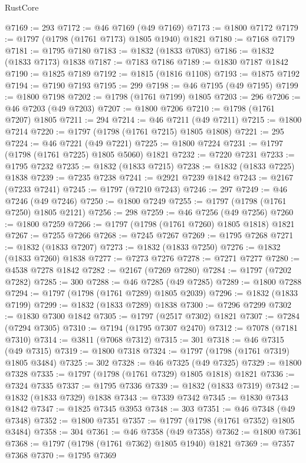 \begin{lexlean}{RustCore}
\begin{coremodule}
@7169 := 293
@7172 := @46 @7169 (@49 @7169)
@7173 := @1800 @7172
@7179 := @1797 (@1798 (@1761 @7173) @1805 @1940) @1821
@7180 := @7168 @7179
@7181 := @1795 @7180
@7183 := @1832 (@1833 @7083)
@7186 := @1832 (@1833 @7173) @1838
@7187 := @7183 @7186
@7189 := @1830 @7187 @1842
@7190 := @1825 @7189
@7192 := @1815 (@1816 @1108)
@7193 := @1875 @7192
@7194 := @7190 @7193
@7195 := 299
@7198 := @46 @7195 (@49 @7195)
@7199 := @1800 @7198
@7202 := @1798 (@1761 @7199) @1805
@7203 := 296
@7206 := @46 @7203 (@49 @7203)
@7207 := @1800 @7206
@7210 := @1798 (@1761 @7207) @1805
@7211 := 294
@7214 := @46 @7211 (@49 @7211)
@7215 := @1800 @7214
@7220 := @1797 (@1798 (@1761 @7215) @1805 @1808)
@7221 := 295
@7224 := @46 @7221 (@49 @7221)
@7225 := @1800 @7224
@7231 := @1797 (@1798 (@1761 @7225) @1805 @5060) @1821
@7232 := @7220 @7231
@7233 := @1795 @7232
@7235 := @1832 (@1833 @7215)
@7238 := @1832 (@1833 @7225) @1838
@7239 := @7235 @7238
@7241 := @2921 @7239 @1842
@7243 := @2167 (@7233 @7241)
@7245 := @1797 (@7210 @7243)
@7246 := 297
@7249 := @46 @7246 (@49 @7246)
@7250 := @1800 @7249
@7255 := @1797 (@1798 (@1761 @7250) @1805 @2121)
@7256 := 298
@7259 := @46 @7256 (@49 @7256)
@7260 := @1800 @7259
@7266 := @1797 (@1798 (@1761 @7260) @1805 @1818) @1821
@7267 := @7255 @7266
@7268 := @7245 @7267
@7269 := @1795 @7268
@7271 := @1832 (@1833 @7207)
@7273 := @1832 (@1833 @7250)
@7276 := @1832 (@1833 @7260) @1838
@7277 := @7273 @7276
@7278 := @7271 @7277
@7280 := @4538 @7278 @1842
@7282 := @2167 (@7269 @7280)
@7284 := @1797 (@7202 @7282)
@7285 := 300
@7288 := @46 @7285 (@49 @7285)
@7289 := @1800 @7288
@7294 := @1797 (@1798 (@1761 @7289) @1805 @2039)
@7296 := @1832 (@1833 @7199)
@7299 := @1832 (@1833 @7289) @1838
@7300 := @7296 @7299
@7302 := @1830 @7300 @1842
@7305 := @1797 (@2517 @7302) @1821
@7307 := @7284 (@7294 @7305)
@7310 := @7194 (@1795 @7307 @2470)
@7312 := @7078 (@7181 @7310)
@7314 := @3811 (@7068 @7312)
@7315 := 301
@7318 := @46 @7315 (@49 @7315)
@7319 := @1800 @7318
@7324 := @1797 (@1798 (@1761 @7319) @1805 @3484)
@7325 := 302
@7328 := @46 @7325 (@49 @7325)
@7329 := @1800 @7328
@7335 := @1797 (@1798 (@1761 @7329) @1805 @1818) @1821
@7336 := @7324 @7335
@7337 := @1795 @7336
@7339 := @1832 (@1833 @7319)
@7342 := @1832 (@1833 @7329) @1838
@7343 := @7339 @7342
@7345 := @1830 @7343 @1842
@7347 := @1825 @7345 @3953
@7348 := 303
@7351 := @46 @7348 (@49 @7348)
@7352 := @1800 @7351
@7357 := @1797 (@1798 (@1761 @7352) @1805 @3484)
@7358 := 304
@7361 := @46 @7358 (@49 @7358)
@7362 := @1800 @7361
@7368 := @1797 (@1798 (@1761 @7362) @1805 @1940) @1821
@7369 := @7357 @7368
@7370 := @1795 @7369

\end{coremodule}
\end{lexlean}
